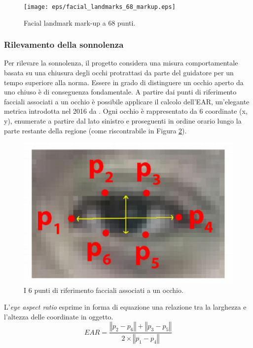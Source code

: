 \documentclass[12pt]{article}
\begin{document}
\begin{figure}[!htb]
	\centering
	\texttt{[image: eps/facial\_landmarks\_68\_markup.eps]}
	\caption{Facial landmark mark-up a 68 punti.}
	\label{fig:facial_landmarks_68_markup}
\end{figure}

\subsubsection{Rilevamento della sonnolenza}

Per rilevare la sonnolenza, il progetto considera una misura comportamentale basata su una chiusura degli occhi protrattasi da parte del guidatore per un tempo superiore alla norma. Essere in grado di distinguere un occhio aperto da uno chiuso è di conseguenza fondamentale. A partire dai punti di riferimento facciali associati a un occhio è possibile applicare il calcolo dell'EAR, un'elegante metrica introdotta nel 2016 da \cite{EAR}.
Ogni occhio è rappresentato da 6 coordinate (x, y), enumerate a partire dal lato sinistro e proseguenti in ordine orario lungo la parte restante della regione (come riscontrabile in Figura \ref{fig:eye_6_landmarks}).
\begin{figure}[!htb]
	\centering
	\includegraphics[scale=0.35]{eps/eye_6_landmarks.eps}
	\caption{I 6 punti di riferimento facciali associati a un occhio.}
	\label{fig:eye_6_landmarks}
\end{figure}
L'\textit{eye aspect ratio} esprime in forma di equazione una relazione tra la larghezza e l'altezza delle coordinate in oggetto.
\begin{equation}
EAR = \frac{\left\Vert{p_2 - p_6}\right\Vert + \left\Vert{p_3 - p_5}\right\Vert}{2 \times {\left\Vert{p_1 - p_4}\right\Vert}}
\end{equation}
\end{document}
